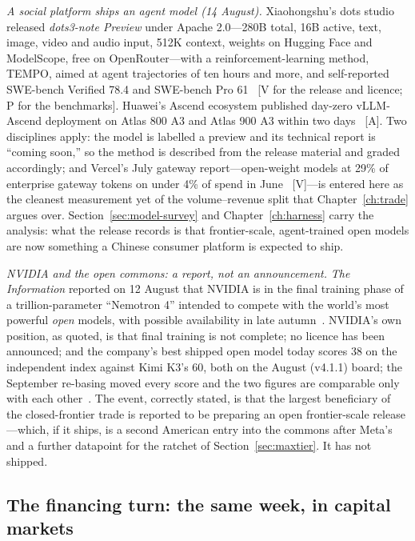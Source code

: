 \emph{A social platform ships an agent model (14 August).} Xiaohongshu's dots studio released \emph{dots3-note Preview} under Apache 2.0---280B total, 16B active, text, image, video and audio input, 512K context, weights on Hugging Face and ModelScope, free on OpenRouter---with a reinforcement-learning method, TEMPO, aimed at agent trajectories of ten hours and more, and self-reported SWE-bench Verified 78.4 and SWE-bench Pro 61~\cite{dots3-note} [V for the release and licence; P for the benchmarks]. Huawei's Ascend ecosystem published day-zero vLLM-Ascend deployment on Atlas 800 A3 and Atlas 900 A3 within two days~\cite{dots3-ascend} [A]. Two disciplines apply: the model is labelled a preview and its technical report is ``coming soon,'' so the method is described from the release material and graded accordingly; and Vercel's July gateway report---open-weight models at 29\% of enterprise gateway tokens on under 4\% of spend in June~\cite{vercel-gateway} [V]---is entered here as the cleanest measurement yet of the volume--revenue split that Chapter~\ref{ch:trade} argues over. Section~\ref{sec:model-survey} and Chapter~\ref{ch:harness} carry the analysis: what the release records is that frontier-scale, agent-trained open models are now something a Chinese consumer platform is expected to ship.

\emph{NVIDIA and the open commons: a report, not an announcement.} \emph{The Information} reported on 12 August that NVIDIA is in the final training phase of a trillion-parameter ``Nemotron 4'' intended to compete with the world's most powerful \emph{open} models, with possible availability in late autumn~\cite{nemotron4}. NVIDIA's own position, as quoted, is that final training is not complete; no licence has been announced; and the company's best shipped open model today scores 38 on the independent index against Kimi K3's 60, both on the August (v4.1.1) board; the September re-basing moved every score and the two figures are comparable only with each other~\cite{aa-v43}. The event, correctly stated, is that the largest beneficiary of the closed-frontier trade is reported to be preparing an open frontier-scale release---which, if it ships, is a second American entry into the commons after Meta's and a further datapoint for the ratchet of Section~\ref{sec:maxtier}. It has not shipped.

\subsection{The financing turn: the same week, in capital markets}

